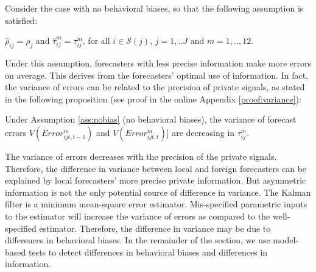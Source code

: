Consider the case with no behavioral biases, so that the following assumption is satisfied:
\begin{assumption}\label{ass:nobias} $\hat\rho_{ij}=\rho_j$ and $\hat\tau_{ij}^m=\tau_{ij}^m$, for all $i\in\mathcal{S}(j)$, $j=1,..J$ and $m=1,..,12$.
\end{assumption}
Under this assumption, forecasters with less precise information make more errors on average. This derives from the forecasters' optimal use of information. In fact, the variance of errors can be related to the precision of private signals, as stated in the following proposition (see proof in the online Appendix \ref{proof:variance}):
\begin{prop}\label{prop:variance} Under Assumption \ref{ass:nobias} (no behavioral biases), the variance of forecast errors $V(Error_{ijt,t-1}^m)$ and $V(Error_{ijt,t}^m)]$ are decreasing in $\tau_{ij}^m$.
\end{prop}
The variance of errors decreases with the precision of the private signals. Therefore, the difference in variance between local and foreign forecasters can be explained by local forecasters' more precise private information. But asymmetric information is not the only potential source of difference in variance. The Kalman filter is a minimum mean-square error estimator. Mis-specified parametric inputs to the estimator will increase the variance of errors as compared to the well-specified estimator. Therefore, the difference in variance may be due to differences in behavioral biases. In the remainder of the section, we use model-based tests to detect differences in behavioral biases and differences in information. 